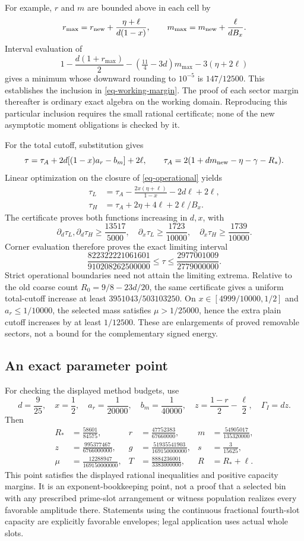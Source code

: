 \documentclass[11pt]{article}
\theoremstyle{definition}
\begin{document}
For example, $r$ and $m$ are bounded above in each cell by
\[
 r_{\max}=r_{\rm new}+\frac{\eta+\ell}{d(1-x)},\qquad
 m_{\max}=m_{\rm new}+\frac{\ell}{dB_x}.
\]
Interval evaluation of
\[
 1-\frac{d(1+r_{\max})}{2}
 -(\tfrac{11}{4}-3d)m_{\max}-3(\eta+2\ell)
\]
gives a minimum whose downward rounding to $10^{-5}$ is $147/12500$. This establishes the inclusion in \eqref{eq-working-margin}. The proof of each sector margin thereafter is ordinary exact algebra on the working domain. Reproducing this particular inclusion requires the small rational certificate; none of the new asymptotic moment obligations is checked by it.

For the total cutoff, substitution gives
\[
 \tau=\tau_A+2d[(1-x)a_r-b_m]+2\ell,\qquad
 \tau_A=2(1+dm_{\rm new}-\eta-\gamma-R_*).
\]
Linear optimization on the closure of \eqref{eq-operational} yields
\begin{align*}
 \tau_L&=\tau_A-\frac{2x(\eta+\ell)}{1-x}-2d\ell+2\ell,\\
 \tau_H&=\tau_A+2\eta+4\ell+2\ell/B_x.
\end{align*}
The certificate proves both functions increasing in $d,x$, with
\[
 \partial_d\tau_L,\partial_d\tau_H\ge\frac{13517}{5000},\quad
 \partial_x\tau_L\ge\frac{1723}{10000},\quad
 \partial_x\tau_H\ge\frac{1739}{10000}.
\]
Corner evaluation therefore proves the exact limiting interval
\[
 \frac{822322221061601}{910208262500000}\le\tau
 \le\frac{2977001009}{2779000000}.
\]
Strict operational boundaries need not attain the limiting extrema. Relative to the old coarse count $R_0=9/8-23d/20$, the same certificate gives a uniform total-cutoff increase at least $3951043/503103250$. On $x\in[4999/10000,1/2]$ and $a_r\le1/10000$, the selected mass satisfies $\mu>1/25000$, hence the extra plain cutoff increases by at least $1/12500$. These are enlargements of proved removable sectors, not a bound for the complementary signed energy.

\subsection{An exact parameter point}
For checking the displayed method budgets, use
\[
 d=\frac9{25},\quad x=\frac12,\quad a_r=\frac1{20000},
 \quad b_m=\frac1{40000},\quad
 z=\frac{1-r}{2}-\frac{\ell}{2},\quad \Gamma_I=dz.
\]
Then
\begin{align*}
 R_*&=\frac{58601}{84575},&
 r&=\frac{47752383}{67660000},&
 m&=\frac{54905017}{135320000},\\
 z&=\frac{995377467}{6766000000},&
 g&=\frac{51935541903}{169150000000},&
 s&=\frac3{15625},\\
 \mu&=\frac{12288947}{169150000000},&
 T&=\frac{8884236001}{3383000000},&R&=R_*+\ell.
\end{align*}
This point satisfies the displayed rational inequalities and positive capacity margins. It is an exponent-bookkeeping point, not a proof that a selected bin with any prescribed prime-slot arrangement or witness population realizes every favorable amplitude there. Statements using the continuous fractional fourth-slot capacity are explicitly favorable envelopes; legal application uses actual whole slots.
\end{document}
